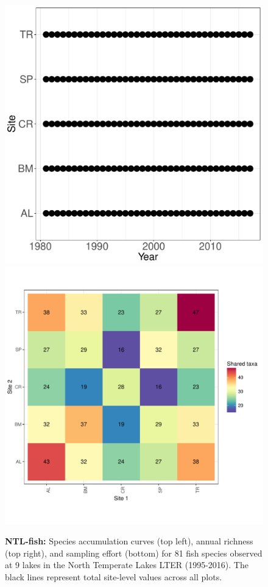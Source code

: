 \documentclass[11pt, oneside]{article}
\begin{document}
\begin{figure}[h!]
\includegraphics[scale = 0.4]{ntl-fish-stanleyLottig_spatiotemporal_sampling_effort.pdf}
\includegraphics[scale = 0.4]{ntl-fish-stanleyLottig_spp_shared.pdf}
\caption{{\bf NTL-fish:} Species accumulation curves (top left),  annual richness (top right), and sampling effort (bottom)  for 81 fish species observed at 9 lakes in the North Temperate Lakes LTER (1995-2016). The black lines represent total site-level values across all plots.}
\label{ntl-fish}
\end{figure}
\end{document}
